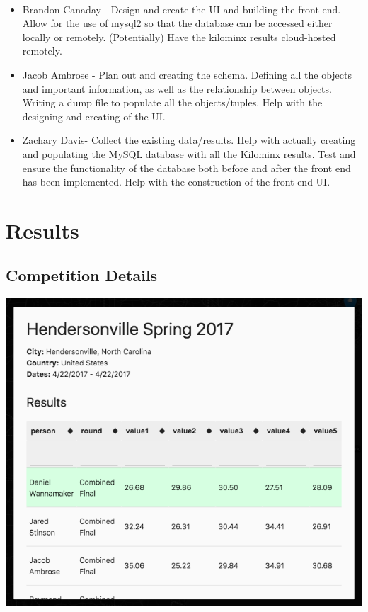 \documentclass[12pt]{article}
\begin{document}
		\paragraph*{}
			\begin{itemize}
				\item Brandon Canaday - Design and create the UI and building the front end. Allow for the use of mysql2 so that the database can be accessed either locally or remotely. (Potentially) Have the kilominx results cloud-hosted remotely.
				\item Jacob Ambrose - Plan out and creating the schema. Defining all the objects and important information, as well as the relationship between objects. Writing a dump file to populate all the objects/tuples. Help with the designing and creating of the UI.
				\item Zachary Davis- Collect the existing data/results. Help with actually creating and populating the MySQL database with all the Kilominx results. Test and ensure the functionality of the database both before and after the front end has been implemented. Help with the construction of the front end UI.
			\end{itemize}

	\section{Results}
		\subsection{Competition Details}
			\begin{center}
				\includegraphics[scale=0.35]{competition_details.png}\\
 			\end{center}
\end{document}
